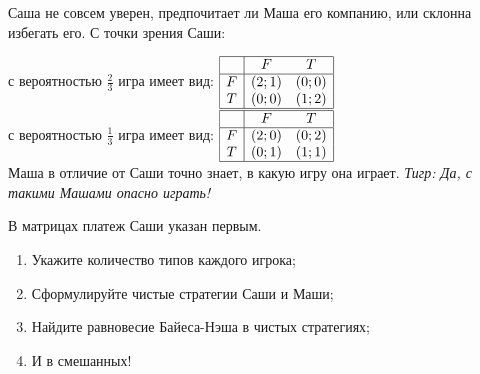 \begin{problem}

Саша не совсем уверен, предпочитает ли Маша его компанию, или склонна избегать его. С точки зрения Саши:

с вероятностью  $\frac{2}{3} $  игра имеет вид:  $\begin{array}{|c|cc|}  \hline {} & {F} & {T} \\  \hline {F} & {\left(2;1\right)} & {\left(0;0\right)} \\ {T} & {\left(0;0\right)} & {\left(1;2\right)} \\  \hline  \end{array}$ \\
с вероятностью  $\frac{1}{3} $  игра имеет вид:  $\begin{array}{|c|cc|}  \hline {} & {F} & {T} \\  \hline {F} & {\left(2;0\right)} & {\left(0;2\right)} \\ {T} & {\left(0;1\right)} & {\left(1;1\right)} \\  \hline  \end{array}$ \\
Маша в отличие от Саши точно знает, в какую игру она играет.
{\it Тигр:  Да, с такими Машами опасно играть!}\par
В матрицах платеж Саши указан первым.\par
\begin{enumerate}
\item	Укажите количество типов каждого игрока;\par
\item 	Сформулируйте чистые стратегии Саши и Маши;\par
\item 	Найдите равновесие Байеса-Нэша в чистых стратегиях;\par
\item 	И в смешанных!\par
\end{enumerate}


\begin{sol}

\end{sol}
\end{problem}



